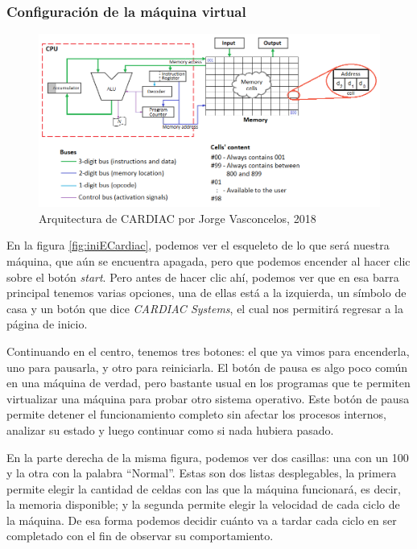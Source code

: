 \documentclass[letterpaper,12pt,oneside]{book}
\begin{document}
    \subsubsection{Configuración de la máquina virtual}
    
	\begin{figure}[h]
 			\centering
			\includegraphics[scale=0.5]{media/ECARDIAC/arq_cardiac.png}
			\caption{Arquitectura de CARDIAC por Jorge Vasconcelos, 2018}
			\label{fig:arqCardiac}
	\end{figure}	
	
	En la figura \ref{fig:iniECardiac}, podemos ver el esqueleto de lo que será nuestra máquina, que aún se encuentra apagada, pero que podemos encender al hacer clic sobre el botón \textit{start}. Pero antes de hacer clic ahí, podemos
	ver que en esa barra principal tenemos varias opciones, una de ellas está a la izquierda, un símbolo de casa y un botón que dice \textit{CARDIAC Systems}, el cual
	nos permitirá regresar a la página de inicio.
 
    Continuando en el centro, tenemos tres botones: el que ya vimos para encenderla, uno para pausarla, y otro para reiniciarla. El botón de pausa
    es algo poco común en una máquina de verdad, pero 
    bastante usual en los programas que te permiten virtualizar una máquina para probar otro sistema operativo. Este botón de pausa
	permite detener el funcionamiento completo sin afectar los procesos internos, analizar su estado
	y luego continuar como si nada hubiera pasado.
	
	En la
	parte derecha de la misma figura, podemos ver dos casillas: una con un 100 y la otra con la palabra ``Normal''. Estas son dos listas desplegables, la primera permite 
	elegir la cantidad de celdas con las que la máquina funcionará, es decir, la memoria disponible; y la segunda permite elegir la velocidad de
	cada ciclo de la máquina. De esa
	forma podemos decidir cuánto va a tardar cada ciclo en ser completado con el fin de observar su comportamiento.
 
\end{document}
